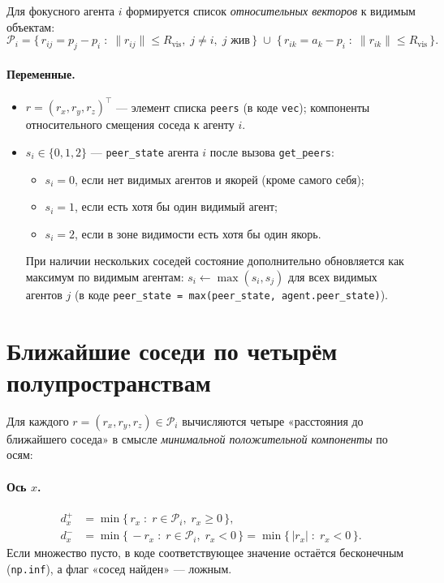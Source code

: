 \documentclass[12pt,a4paper]{article}
\begin{document}
Для фокусного агента $i$ формируется список \emph{относительных векторов} к видимым объектам:
\begin{equation}
  \mathcal{P}_i = \{\, r_{ij} = p_j - p_i \;:\; \|r_{ij}\| \le R_{\mathrm{vis}},\; j \ne i,\; j \text{ жив} \,\}
  \;\cup\;
  \{\, r_{ik} = a_k - p_i \;:\; \|r_{ik}\| \le R_{\mathrm{vis}} \,\}.
\end{equation}

\paragraph{Переменные.}
\begin{itemize}
  \item $r = (r_x, r_y, r_z)^\top$ --- элемент списка \texttt{peers} (в коде \texttt{vec}); компоненты относительного смещения соседа к агенту $i$.
  \item $s_i \in \{0,1,2\}$ --- \texttt{peer\_state} агента $i$ после вызова \texttt{get\_peers}:
  \begin{itemize}
    \item $s_i = 0$, если нет видимых агентов и якорей (кроме самого себя);
    \item $s_i = 1$, если есть хотя бы один видимый агент;
    \item $s_i = 2$, если в зоне видимости есть хотя бы один якорь.
  \end{itemize}
  При наличии нескольких соседей состояние дополнительно обновляется как максимум по видимым агентам: $s_i \leftarrow \max(s_i, s_j)$ для всех видимых агентов $j$ (в коде \texttt{peer\_state = max(peer\_state, agent.peer\_state)}).
\end{itemize}

\section{Ближайшие соседи по четырём полупространствам}
\label{sec:nearest}

Для каждого $r = (r_x, r_y, r_z) \in \mathcal{P}_i$ вычисляются четыре «расстояния до ближайшего соседа» в смысле \emph{минимальной положительной компоненты} по осям:

\paragraph{Ось $x$.}
\begin{align}
  d_x^+ &= \min \{\, r_x \;:\; r \in \mathcal{P}_i,\; r_x \ge 0 \,\}, \\
  d_x^- &= \min \{\, -r_x \;:\; r \in \mathcal{P}_i,\; r_x < 0 \,\}
         = \min \{\, |r_x| \;:\; r_x < 0 \,\}.
\end{align}
Если множество пусто, в коде соответствующее значение остаётся бесконечным (\texttt{np.inf}), а флаг «сосед найден» --- ложным.
\end{document}
